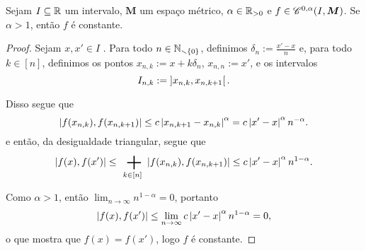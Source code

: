 \begin{proposition}
Sejam $I \subseteq \mathbb{R}$ um intervalo, $\bm M$ um espaço métrico, $\alpha \in \mathbb{R}_{>0}$ e $f \in \mathscr{C}^{0,\alpha}(I, \bm M)$. Se $\alpha>1$, então $f$ é constante.
\end{proposition}
\begin{proof}
Sejam $x, x' \in I$ . Para todo $n \in \mathbb{N}_{\smallsetminus\{0\}}$, definimos $\delta_n := \frac{x'-x}{n}$ e, para todo $k \in [n]$, definimos os pontos $x_{n,k} := x + k\delta_n$, $x_{n,n} := x'$, e os intervalos
	\begin{equation*}
	I_{n,k} := \left]x_{n,k},\allowbreak x_{n,k+1}\right[.
	\end{equation*}

Disso segue que
	\begin{equation*}
	\left\vert{f(x_{n,k})},{f(x_{n,k+1})}\right\vert \leq c \left\vert{x_{n,k+1} - x_{n,k}}\right\vert^\alpha = c \left\vert{x'-x}\right\vert^\alpha n^{-\alpha}.
	\end{equation*}
e então, da desigualdade triangular, segue que
	\begin{equation*}
	\dist{f(x)}{f(x')} \leq \sum_{k \in [n]} \dist{f(x_{n,k})}{f(x_{n,k+1})} \leq c \abs{x'-x}^\alpha n^{1-\alpha}.
	\end{equation*}

Como $\alpha > 1$, então $\lim_{n \to \infty} n^{1-\alpha} = 0$, portanto
	\begin{equation*}
	\left\vert{f(x)},{f(x')}\right\vert \leq \lim_{n \to \infty} c \left\vert{x'-x}\right\vert^\alpha n^{1-\alpha} = 0,
	\end{equation*}
o que mostra que $f(x) = f(x')$, logo $f$ é constante.
\end{proof}





